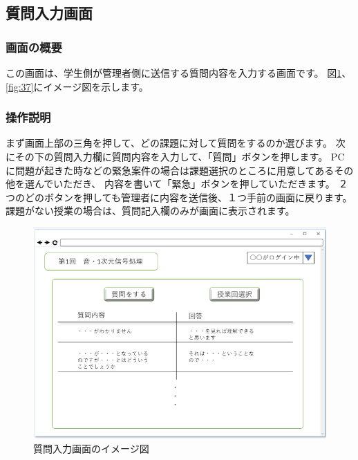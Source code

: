 \subsection{質問入力画面}
\subsubsection{画面の概要}
この画面は、学生側が管理者側に送信する質問内容を入力する画面です。
図\ref{fig:36}、\ref{fig:37}にイメージ図を示します。

\subsubsection{操作説明}
まず画面上部の三角を押して、どの課題に対して質問をするのか選びます。
次にその下の質問入力欄に質問内容を入力して、「質問」ボタンを押します。
PCに問題が起きた時などの緊急案件の場合は課題選択のところに用意してあるその他を選んでいただき、
内容を書いて「緊急」ボタンを押していただきます。
２つのどのボタンを押しても管理者に内容を送信後、１つ手前の画面に戻ります。
課題がない授業の場合は、質問記入欄のみが画面に表示されます。
\begin{figure}[phtbp]
  \begin{center}
    \includegraphics[width=1\linewidth,clip]{./img/36.png}
    \caption{質問入力画面のイメージ図}\label{fig:36}
  \end{center}
\end{figure}

